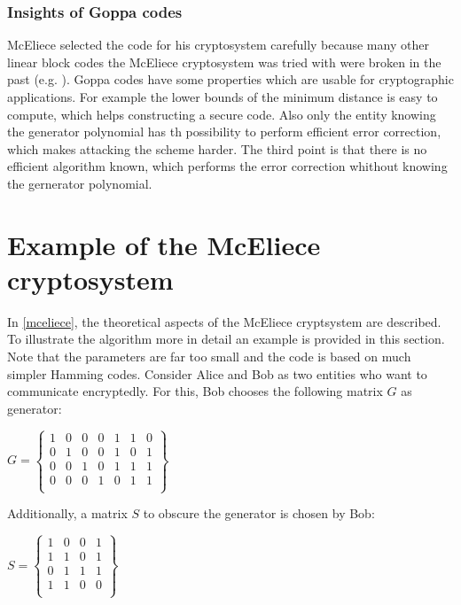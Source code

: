 \subsubsection*{Insights of Goppa codes} McEliece selected the code for his cryptosystem carefully because many other linear block codes the McEliece cryptosystem was tried with were broken in the past (e.g. \cite{sidelnikov1992insecurity}). Goppa codes have some properties which are usable for cryptographic applications. For example the lower bounds of the minimum distance is easy to compute, which helps constructing a secure code. Also only the entity knowing the generator polynomial has th possibility to perform efficient error correction, which makes attacking the scheme harder. The third point is that there is no efficient algorithm known, which performs the error correction whithout knowing the gernerator polynomial\cite{engelbert2007summary}.


\section{Example of the McEliece cryptosystem}
\label{example}
In \autoref{mceliece}, the theoretical aspects of the McEliece cryptsystem are described. To illustrate the algorithm more in detail an example is provided in this section. Note that the parameters are far too small and the code is based on much simpler Hamming codes.
\newline
Consider Alice and Bob as two entities who want to communicate encryptedly. 
For this, Bob chooses the following matrix $G$ as generator: 
\begin{center}
$
G =
\begin{Bmatrix}
1 & 0 & 0 & 0 & 1 & 1 & 0 \\
0 & 1 & 0 & 0 & 1 & 0 & 1 \\
0 & 0 & 1 & 0 & 1 & 1 & 1 \\
0 & 0 & 0 & 1 & 0 & 1 & 1 \\
\end{Bmatrix}
$
\end{center}
Additionally, a matrix  $S$ to obscure the generator is chosen by Bob:
\begin{center}
	$
	S =
	\begin{Bmatrix}
	1 & 0 & 0 & 1 \\
	1 & 1 & 0 & 1 \\
	0 & 1 & 1 & 1 \\
	1 & 1 & 0 & 0 \\
	\end{Bmatrix}
	$
\end{center}

